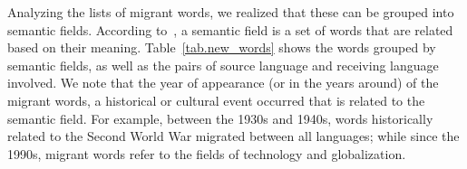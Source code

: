 \documentclass[10pt,letterpaper]{article} %
\begin{document}
Analyzing the lists  of 
migrant words, we realized that
these can be grouped into semantic fields. According to~\cite{semantic_oxford},
a semantic field is a set of words that are related based on their meaning.
Table~\ref{tab.new_words} shows the words grouped by semantic fields, as well as
the pairs of source language and receiving language involved. We note that the
year of appearance (or in the years around) of the migrant words, a historical
or cultural event occurred that is related to the semantic field. For example,
between the 1930s and 1940s, words historically related to the Second World War
migrated between all languages; while since the 1990s, migrant words refer
to the fields of technology and globalization.  
\end{document}
